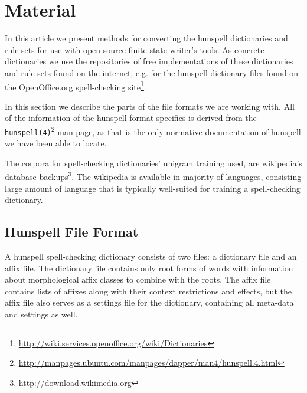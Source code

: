 \documentclass[postprint]{flammie}
\begin{document}
\section{Material}
\label{sec:material}

In this article we present methods for converting the hunspell 
dictionaries and rule sets for use with open-source finite-state
writer's tools.  As concrete dictionaries we use the repositories of
free implementations of these dictionaries and rule sets found on the
internet, e.g. for the hunspell dictionary files found on the
OpenOffice.org spell-checking
site\footnote{\url{http://wiki.services.openoffice.org/wiki/Dictionaries}}.

In this section we describe the parts of the file formats we are
working with. All of the information of the hunspell format specifics
is derived from the
\texttt{hunspell(4)}\footnote{\url{http://manpages.ubuntu.com/manpages/dapper/man4/hunspell.4.html}}
man page, as that is the only normative documentation of hunspell we
have been able to locate. 

The corpora for spell-checking dictionaries' unigram training used, are
wikipedia's database backups\footnote{\url{http://download.wikimedia.org}}. The
wikipedia is available in majority of languages, consisting large amount of
language that is typically well-suited for training a spell-checking dictionary.


\subsection{Hunspell File Format}
\label{subsec:material-hunspell}

A hunspell spell-checking dictionary consists of two files: a
dictionary file and an affix file. The dictionary file contains only
root forms of words with information about morphological affix classes
to combine with the roots.  The affix file contains lists of affixes
along with their context restrictions and effects, but the affix file
also serves as a settings file for the dictionary, containing all
meta-data and settings as well.
\end{document}
